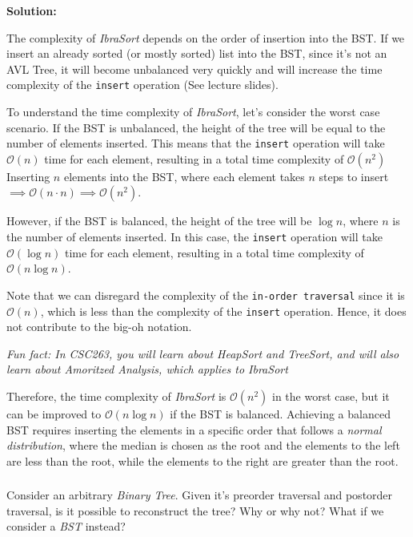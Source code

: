 \documentclass[12pt]{article}
\begin{document}
    \textbf{Solution:}

    The complexity of \textit{IbraSort} depends on the order of insertion into the BST. If we insert an already sorted (or mostly sorted) list into the BST, since it's not an AVL Tree, it will become unbalanced very quickly and will increase the time complexity of the \texttt{insert} operation (See lecture slides).

    To understand the time complexity of \textit{IbraSort}, let's consider the worst case scenario. If the BST is unbalanced, the height of the tree will be equal to the number of elements inserted. This means that the \texttt{insert} operation will take $\mathcal{O}(n)$ time for each element, resulting in a total time complexity of $\mathcal{O}(n^2)$ Inserting $n$ elements into the BST, where each element takes $n$ steps to insert $\implies \mathcal{O}(n \cdot n) \implies \mathcal{O}(n^2)$.

    However, if the BST is balanced, the height of the tree will be $\log n$, where $n$ is the number of elements inserted. In this case, the \texttt{insert} operation will take $\mathcal{O}(\log n)$ time for each element, resulting in a total time complexity of $\mathcal{O}(n \log n)$.
    
    Note that we can disregard the complexity of the \texttt{in-order traversal} since it is $\mathcal{O}(n)$, which is less than the complexity of the \texttt{insert} operation. Hence, it does not contribute to the big-oh notation.

    \textit{Fun fact: In CSC263, you will learn about HeapSort and TreeSort, and will also learn about Amoritzed Analysis, which applies to IbraSort}

    Therefore, the time complexity of \textit{IbraSort} is $\mathcal{O}(n^2)$ in the worst case, but it can be improved to $\mathcal{O}(n \log n)$ if the BST is balanced. Achieving a balanced BST requires inserting the elements in a specific order that follows a \textit{normal distribution}, where the median is chosen as the root and the elements to the left are less than the root, while the elements to the right are greater than the root.

    \subsubsection{}
    Consider an arbitrary \textit{Binary Tree}. Given it's preorder traversal and postorder traversal, is it possible to reconstruct the tree? Why or why not? What if we consider a \textit{BST} instead? \\
    \vspace{1cm}
\end{document}
